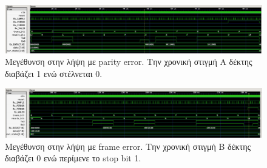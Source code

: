 \documentclass[../main.tex]{subfiles}
\begin{document}
\begin{figure}[H]
  \begin{center}
    \includegraphics[width=\textwidth]{../images/parity_error.png}
  \end{center}
  \caption{Μεγέθυνση στην λήψη με parity error. Την χρονική στιγμή A δέκτης
  διαβάζει 1 ενώ στέλνεται 0.}
\end{figure}

\begin{figure}[H]
  \begin{center}
    \includegraphics[width=\textwidth]{../images/frame_error.png}
  \end{center}
  \caption{Μεγέθυνση στην λήψη με frame error. Την χρονική στιγμή B δέκτης
  διαβάζει 0 ενώ περίμενε το stop bit 1.}
\end{figure}
\end{document}

